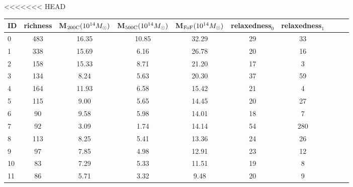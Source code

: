 <<<<<<< HEAD
\begin{tabular}{lccccccccc}
\toprule
ID & richness & M$_{\rm 200C} (10^{14} M_\odot)$ & M$_{\rm 500C} (10^{14} M_\odot)$ & M$_{\rm FoF} (10^{14} M_\odot)$  & relaxedness$_0$ & relaxedness$_1$ \\
\midrule
 0 &      483 &                            16.35 &                            10.85 &                            32.29 &              29 &              33 \\
 1 &      338 &                            15.69 &                             6.16 &                            26.78 &              20 &              16 \\
 2 &      158 &                            15.33 &                             8.71 &                            21.20 &              17 &               3 \\
 3 &      134 &                             8.24 &                             5.63 &                            20.30 &              37 &              59 \\
 4 &      164 &                            11.93 &                             6.58 &                            15.42 &              21 &               4 \\
 5 &      115 &                             9.00 &                             5.65 &                            14.45 &              20 &              27 \\
 6 &       90 &                             9.58 &                             5.98 &                            14.01 &              18 &               7 \\
 7 &       92 &                             3.09 &                             1.74 &                            14.14 &              54 &             280 \\
 8 &      113 &                             8.25 &                             5.41 &                            13.36 &              24 &              26 \\
 9 &       97 &                             7.85 &                             4.98 &                            12.91 &              23 &              12 \\
10 &       83 &                             7.29 &                             5.33 &                            11.51 &              19 &               8 \\
11 &       86 &                             5.71 &                             3.32 &                             9.48 &              20 &               9 \\

\end{tabular}
